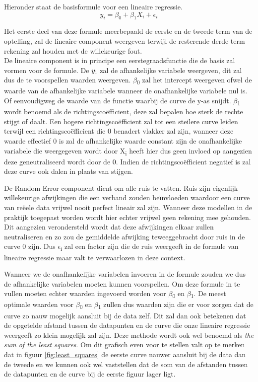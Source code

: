 Hieronder staat de basisformule voor een lineaire regressie. 
\begin{equation}
y_i = \beta_0 + \beta_1 X_i + \epsilon_i
\end{equation}

Het eerste deel van deze formule meerbepaald de eerste en de tweede term van de optelling, zal de lineaire component weergeven terwijl de resterende derde term rekening zal houden met de willekeurige fout.
\\ De lineaire component is in principe een eerstegraadsfunctie die de basis zal vormen voor de formule. De $y\textsubscript{i}$ zal de afhankelijke variabele weergeven, dit zal dus de te voorspellen waarden weergeven. $\beta$\textsubscript{0} zal het intercept weergeven ofwel de waarde van de afhankelijke variabele wanneer de onafhankelijke variabele nul is. Of eenvoudigweg de waarde van de functie waarbij de curve de y-as snijdt. $\beta$\textsubscript{1} wordt benoemd als de richtingsco\"{e}fficient, deze zal bepalen hoe sterk de rechte stijgt of daalt. Een hogere richtingsco\"{e}fficient zal tot een steilere curve leiden terwijl een richtingsco\"{e}fficient die 0 benadert vlakker zal zijn, wanneer deze waarde effectief 0 is zal de afhankelijke waarde constant zijn de onafhankelijke variabele die weergegeven wordt door X\textsubscript{i} heeft hier dus geen invloed op aangezien deze geneutraliseerd wordt door de 0. Indien de richtingsco\"{e}fficient negatief is zal deze curve ook dalen in plaats van stijgen.

De Random Error component dient om alle ruis te vatten. Ruis zijn eigenlijk willekeurige afwijkingen die een verband zouden be\"{i}nvloeden waardoor een curve van re\"{e}ele data vrijwel nooit perfect lineair zal zijn. Wanneer deze modellen in de praktijk toegepast worden wordt hier echter vrijwel geen rekening mee gehouden. Dit aangezien verondersteld wordt dat deze afwijkingen elkaar zullen neutraliseren en zo zou de gemiddelde afwijking teweeggebracht door ruis in de curve 0 zijn. Dus $\epsilon$\textsubscript{i} zal een factor zijn die de ruis weergeeft in de formule van lineaire regressie maar valt te verwaarlozen in deze context.

Wanneer we de onafhankelijke variabelen invoeren in de formule zouden we dus de afhankelijke variabelen moeten kunnen voorspellen. Om deze formule in te vullen moeten echter waarden ingevoerd worden voor $\beta$\textsubscript{0} en $\beta$\textsubscript{1}. De meest optimale waarden voor $\beta$\textsubscript{0} en $\beta$\textsubscript{1} zullen dus waarden zijn die er voor zorgen dat de curve zo nauw mogelijk aansluit bij de data zelf. Dit zal dan ook betekenen dat de opgetelde afstand tussen de datapunten en de curve die onze lineaire regressie weergeeft zo klein mogelijk zal zijn. Deze methode wordt ook wel benoemd als \textit{the sum of the least squares}. Om dit grafisch even voor te stellen valt op te merken dat in figuur \ref{fig:least_squares} de eerste curve nauwer aansluit bij de data dan de tweede en we kunnen ook wel vaststellen dat de som van de afstanden tussen de datapunten en de curve bij de eerste figuur lager ligt.

